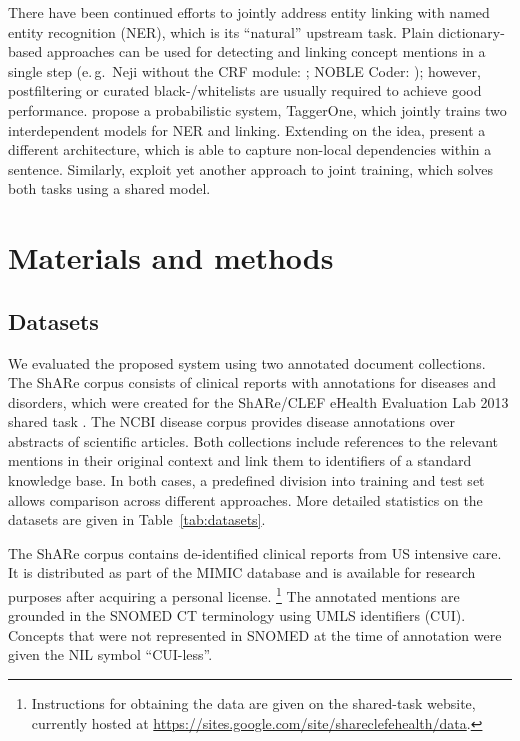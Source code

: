 \documentclass{bioinfo}
\newcommand{\url}[1]{\href{#1}{#1}}
\newcommand{\eg}{e.\,g.\ }
\begin{document}
There have been continued efforts to jointly address entity linking with named entity recognition (NER), which is its ``natural'' upstream task.
Plain dictionary-based approaches can be used for detecting and linking concept mentions in a single step (\eg Neji without the CRF module: \citealp{campos-et-al:2013:neji}; NOBLE Coder: \citealp{tseytlin-et-al:2016});  %
however, postfiltering \citep{basaldella-et-al:2017,cuzzola-et-al:2017} or curated black-/whitelists \citep{pafilis-et-al:2013} are usually required to achieve good performance.
\cite{leaman-lu:2016} propose a probabilistic system, TaggerOne, which jointly trains two interdependent models for NER and linking.
Extending on the idea, \cite{lou-et-al:2017} present a different architecture, which is able to capture non-local dependencies within a sentence.
Similarly, \cite{ter-horst-et-al:2017:LDK} exploit yet another approach to joint training, which solves both tasks using a shared model.



\section{Materials and methods}

\subsection{Datasets}

We evaluated the proposed system using two annotated document collections.
The ShARe corpus consists of clinical reports with annotations for diseases and disorders, which were created for the ShARe/CLEF eHealth Evaluation Lab 2013 shared task \citep{pradhan-et-al:2013:CLEF}.
The NCBI disease corpus \citep{islamaj-dogan-et-al:2014} provides disease annotations over abstracts of scientific articles.
Both collections include references to the relevant mentions in their original context and link them to identifiers of a standard knowledge base.
In both cases, a predefined division into training and test set allows comparison across different approaches.
More detailed statistics on the datasets are given in Table~\ref{tab:datasets}.

The ShARe corpus contains de-identified clinical reports from US intensive care.
It is distributed as part of the MIMIC database  %
and is available for research purposes after acquiring a personal license.%
\footnote{Instructions for obtaining the data are given on the shared-task website, currently hosted at \url{https://sites.google.com/site/shareclefehealth/data}.}
The annotated mentions are grounded in the SNOMED CT terminology \citep{stearns-et-al:2001}
using UMLS  %
identifiers (CUI).
Concepts that were not represented in SNOMED at the time of annotation were given the NIL symbol “CUI-less”.
\end{document}
